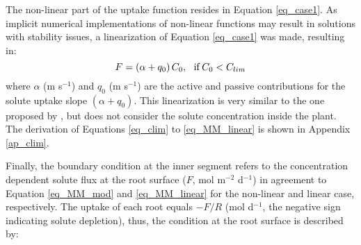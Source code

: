 The non-linear part of the uptake function resides in Equation \ref{eq_case1}. 
As implicit numerical implementations of non-linear functions may result in solutions with stability issues, a linearization of Equation \ref{eq_case1} was made, resulting in:
\begin{equation}
\label{eq_MM_linear}
F = (\alpha + q_0)\,C_0,\,\,\,\,{\rm if }\, C_0 < C_{lim} 
\end{equation}
%
where $\alpha$ (m s$^{-1}$) and $q_0$ (m s$^{-1}$) are the active and passive contributions for the solute uptake slope $(\alpha+q_0)$.
This linearization is very similar to the one proposed by \cite{tinker}, but does not consider the solute concentration inside the plant.
The derivation of Equations \ref{eq_clim} to \ref{eq_MM_linear} is shown in Appendix \ref{ap_clim}.

Finally, the boundary condition at the inner segment refers to the concentration dependent solute flux at the root surface ($F$, mol m$^{-2}$ d$^{-1}$) in agreement to Equation \ref{eq_MM_mod} and \ref{eq_MM_linear} for the non-linear and linear case, respectively.
The uptake of each root equals $-F/R$ (mol d$^{-1}$, the negative sign indicating solute depletion), thus, the condition at the root surface is described by:

